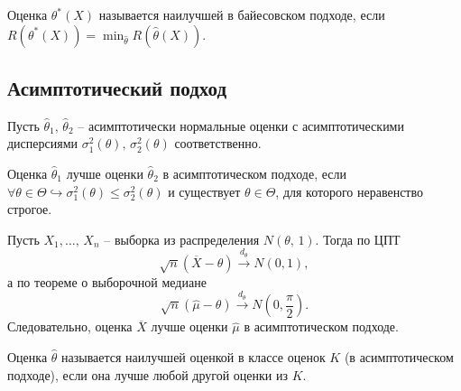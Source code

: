 \begin{definition}
    Оценка $\displaystyle \theta ^{*}( X)$ называется наилучшей в байесовском подходе, если $\displaystyle R\left( \theta ^{*}( X)\right) =\min_{\hat{\theta }} R(\hat{\theta }( X))$.
\end{definition}

\subsection*{Асимптотический подход}

Пусть $\displaystyle \hat{\theta }_{1},\, \hat{\theta }_{2}$ -- асимптотически нормальные оценки с асимптотическими дисперсиями $\displaystyle \sigma _{1}^{2}( \theta ) ,\, \sigma _{2}^{2}( \theta )$ соответственно.

\begin{definition}
    Оценка $\displaystyle \hat{\theta }_{1}$ лучше оценки $\displaystyle \hat{\theta }_{2}$ в асимптотическом подходе, если $\displaystyle \forall \theta \in \Theta \hookrightarrow \sigma _{1}^{2}( \theta ) \leqslant \sigma _{2}^{2}( \theta )$ и существует $\displaystyle \theta \in \Theta $, для которого неравенство строгое.
\end{definition}

\begin{example}
    Пусть $\displaystyle X_{1} ,\dotsc ,\, X_{n}$ -- выборка из распределения $\displaystyle N( \theta,\, 1)$. Тогда по ЦПТ
    \begin{equation}
        \sqrt{n}(\overline{X} -\theta )\xrightarrow{d_{\theta }} N( 0,1),
    \end{equation}
    а по теореме о выборочной медиане
    \begin{equation}
        \sqrt{n}(\hat{\mu } -\theta )\xrightarrow{d_{\theta }} N\left( 0,\frac{\pi }{2}\right).
    \end{equation}
    Следовательно, оценка $\displaystyle \overline{X}$ лучше оценки $\displaystyle \hat{\mu }$ в асимптотическом подходе.
\end{example}

\begin{definition}
    Оценка $\displaystyle \hat{\theta }$ называется наилучшей оценкой в классе оценок $\displaystyle K$ (в асимптотическом подходе), если она лучше любой другой оценки из $\displaystyle K$.
\end{definition}
